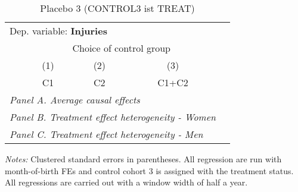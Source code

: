  \begin{table}[H] \centering \begin{threeparttable} \caption{Placebo 3 (CONTROL3 ist TREAT) } {\def\sym#1{\ifmmode^{#1}\else\(^{#1}\)\fi} \begin{tabular}{l*{4}{c}} \toprule \multicolumn{4}{l}{Dep. variable: \textbf{Injuries}} \\ & \multicolumn{3}{c}{Choice of control group} \\ \cmidrule(lr){2-4}
            &\multicolumn{1}{c}{(1)}&\multicolumn{1}{c}{(2)}&\multicolumn{1}{c}{(3)}\\
            &\multicolumn{1}{c}{C1}&\multicolumn{1}{c}{C2}&\multicolumn{1}{c}{C1+C2}\\
\midrule
 \multicolumn{4}{l}{\emph{Panel A. Average causal effects}} \\      \midrule\multicolumn{4}{l}{\emph{Panel B. Treatment effect heterogeneity - Women}} \\      \midrule\multicolumn{4}{l}{\emph{Panel C. Treatment effect heterogeneity - Men}} \\      
\bottomrule \end{tabular} } \begin{tablenotes} \item \scriptsize \emph{Notes:} Clustered standard errors in parentheses. All regression are run with month-of-birth FEs and control cohort 3 is assigned with the treatment status. All regressions are carried out with a window width of half a year. \end{tablenotes} \end{threeparttable} \end{table} 
